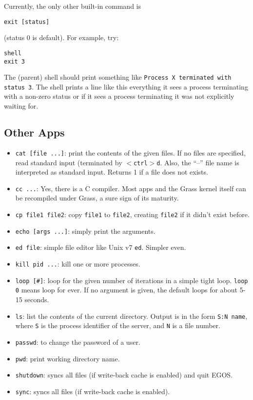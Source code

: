 \documentclass{article}
\begin{document}
Currently, the only other built-in command is
\begin{verbatim}
exit [status]
\end{verbatim}
(status 0 is default).
For example, try:
\begin{verbatim}
shell
exit 3
\end{verbatim}
The (parent) shell should print something like
\texttt{Process X terminated with status 3}.
The shell prints a line like this everything it sees a process terminating
with a non-zero status or if it sees a process terminating it was not
explicitly waiting for.

\subsection{Other Apps}

\begin{itemize}
\item \texttt{cat [file ...]}: print the contents of the given files.
If no files are specified, read standard input (terminated by
\texttt{$<$ctrl$>$d}.  Also, the ``--'' file name is interpreted
as standard input.  Returns 1 if a file does not exists.
\item \texttt{cc ...}: Yes, there is a C compiler.  Most apps and the
Grass kernel itself can be recompiled under Grass, a sure sign of
its maturity.
\item \texttt{cp file1 file2}: copy \texttt{file1} to \texttt{file2},
creating \texttt{file2} if it didn't exist before.
\item \texttt{echo [args ...]}: simply print the arguments.
\item \texttt{ed file}: simple file editor like Unix v7 \texttt{ed}.  Simpler even.
\item \texttt{kill pid ...}: kill one or more processes.
\item \texttt{loop [\#]}: loop for the given number of iterations in a
simple tight loop.  \texttt{loop 0} means loop for ever.  If no argument
is given, the default loops for about 5-15 seconds.
\item \texttt{ls}: list the contents of the current directory.
Output is in the form \texttt{S:N name}, where \texttt{S} is the
process identifier of the server, and \texttt{N} is a file number.
\item \texttt{passwd}: to change the password of a user.
\item \texttt{pwd}: print working directory name.
\item \texttt{shutdown}: syncs all files (if write-back cache is enabled) and quit EGOS.
\item \texttt{sync}: syncs all files (if write-back cache is enabled).
\end{itemize}
\end{document}
